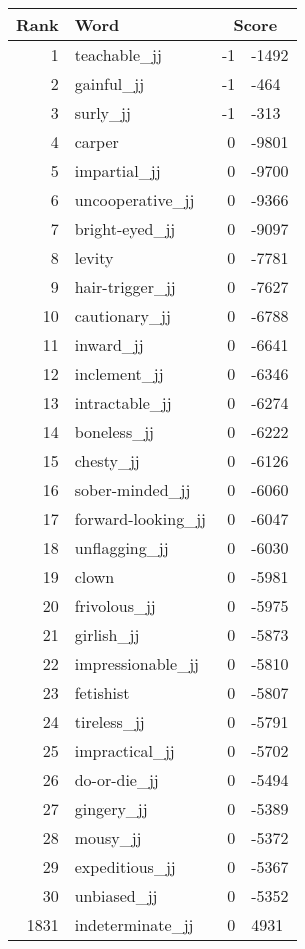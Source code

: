 \begin{longtable}[!htbp]{| rlr@{.}l |}
    \hline
    \textbf{Rank} & \textbf{Word} & \multicolumn{2}{c|}{\textbf{Score}} \\
    \hline
    \endhead
    1 & teachable\_jj & -1 & -1492 \\
    2 & gainful\_jj & -1 & -464 \\
    3 & surly\_jj & -1 & -313 \\
    4 & carper & 0 & -9801 \\
    5 & impartial\_jj & 0 & -9700 \\
    6 & uncooperative\_jj & 0 & -9366 \\
    7 & bright-eyed\_jj & 0 & -9097 \\
    8 & levity & 0 & -7781 \\
    9 & hair-trigger\_jj & 0 & -7627 \\
    10 & cautionary\_jj & 0 & -6788 \\
    11 & inward\_jj & 0 & -6641 \\
    12 & inclement\_jj & 0 & -6346 \\
    13 & intractable\_jj & 0 & -6274 \\
    14 & boneless\_jj & 0 & -6222 \\
    15 & chesty\_jj & 0 & -6126 \\
    16 & sober-minded\_jj & 0 & -6060 \\
    17 & forward-looking\_jj & 0 & -6047 \\
    18 & unflagging\_jj & 0 & -6030 \\
    19 & clown & 0 & -5981 \\
    20 & frivolous\_jj & 0 & -5975 \\
    21 & girlish\_jj & 0 & -5873 \\
    22 & impressionable\_jj & 0 & -5810 \\
    23 & fetishist & 0 & -5807 \\
    24 & tireless\_jj & 0 & -5791 \\
    25 & impractical\_jj & 0 & -5702 \\
    26 & do-or-die\_jj & 0 & -5494 \\
    27 & gingery\_jj & 0 & -5389 \\
    28 & mousy\_jj & 0 & -5372 \\
    29 & expeditious\_jj & 0 & -5367 \\
    30 & unbiased\_jj & 0 & -5352 \\
    1831 & indeterminate\_jj & 0 & 4931 \\

\end{longtable}
